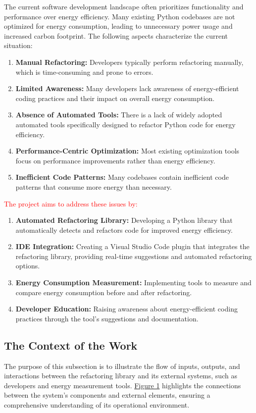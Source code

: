 \documentclass[12pt]{article}
\begin{document}
The current software development landscape often prioritizes
functionality and performance over energy efficiency. Many existing
Python codebases are not optimized for energy consumption, leading to
unnecessary power usage and increased carbon footprint. The following
aspects characterize the current situation:
\begin{enumerate}
  \item \textbf{Manual Refactoring:} Developers typically perform
    refactoring manually, which is time-consuming and prone to errors.
  \item \textbf{Limited Awareness:} Many developers lack awareness of
    energy-efficient coding practices and their impact on overall
    energy consumption.
  \item \textbf{Absence of Automated Tools:} There is a lack of
    widely adopted automated tools specifically designed to refactor
    Python code for energy efficiency.
  \item \textbf{Performance-Centric Optimization:} Most existing
    optimization tools focus on performance improvements rather than
    energy efficiency.
  \item \textbf{Inefficient Code Patterns:} Many codebases contain
    inefficient code patterns that consume more energy than necessary.
\end{enumerate}

\textcolor{red}{The project aims to address these issues by:}
\begin{enumerate}
  \item \textbf{Automated Refactoring Library:} Developing a Python
    library that automatically detects and refactors code for
    improved energy efficiency.
  \item \textbf{IDE Integration:} Creating a Visual Studio Code
    plugin that integrates the refactoring library, providing
    real-time suggestions and automated refactoring options.
  \item \textbf{Energy Consumption Measurement:} Implementing tools
    to measure and compare energy consumption before and after refactoring.
  \item \textbf{Developer Education:} Raising awareness about
    energy-efficient coding practices through the tool's suggestions
    and documentation.
\end{enumerate}

\subsection{The Context of the Work}
The purpose of this subsection is to illustrate the flow of inputs,
outputs, and interactions between the refactoring library and its
external systems, such as developers and energy measurement tools.
\hyperref[img:work-context]{Figure 1} highlights the connections between 
the system's components and external elements, ensuring a comprehensive 
understanding of its operational environment.
\end{document}
